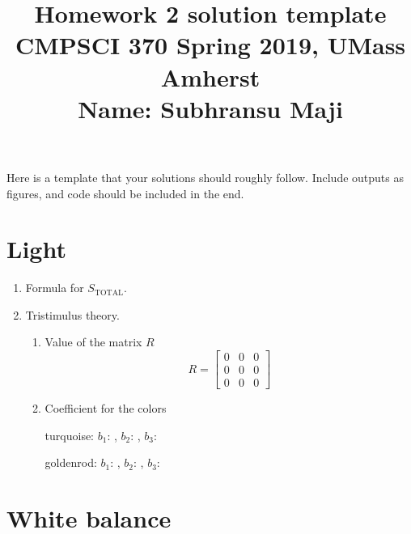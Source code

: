 \documentclass[10pt,letterpaper]{article}
\title{
  Homework 2 solution template\\
  \Large{CMPSCI 370 Spring 2019, UMass Amherst} \\
  \Large{Name: Subhransu Maji} \\
}
\date{}
\begin{document}
\maketitle

\renewcommand\thesubsection{\thesection.\alph{subsection}}

Here is a template that your solutions should roughly follow. Include outputs as figures, and code should be included in the end.

\section{Light}
\begin{enumerate}[label=(\alph*)]
\item Formula for $S_{\text{TOTAL}}$.
\vspace{1in}
\item Tristimulus theory.
	\begin{enumerate}[label=(\arabic*)]
		\item Value of the matrix $R$
		\begin{equation*}
		R=\begin{bmatrix}
			0 & 0 & 0 \\
			0 & 0 & 0 \\
			0 & 0 & 0 
		\end{bmatrix}
		\end{equation*}
		\item Coefficient for the colors
		
		turquoise: $b_1$: \underline{\hspace{3cm}}, $b_2$: \underline{\hspace{3cm}}, $b_3$:\underline{\hspace{3cm}}
		
		goldenrod: $b_1$: \underline{\hspace{3cm}}, $b_2$: \underline{\hspace{3cm}}, $b_3$:\underline{\hspace{3cm}}
	\end{enumerate}
\end{enumerate}


\section{White balance}
\end{document}
